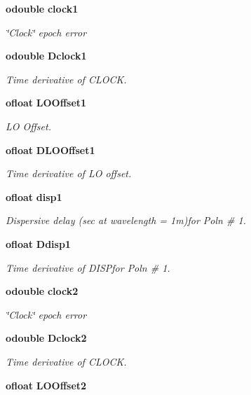 \begin{CompactItemize}
{\bf odouble} {\bf clock1}
\begin{CompactList}\small\item\em \char`\"{}Clock\char`\"{} epoch error \item\end{CompactList}\item 
{\bf odouble} {\bf Dclock1}
\begin{CompactList}\small\item\em Time derivative of CLOCK. \item\end{CompactList}\item 
{\bf ofloat} {\bf LOOffset1}
\begin{CompactList}\small\item\em LO Offset. \item\end{CompactList}\item 
{\bf ofloat} {\bf DLOOffset1}
\begin{CompactList}\small\item\em Time derivative of LO offset. \item\end{CompactList}\item 
{\bf ofloat} {\bf disp1}
\begin{CompactList}\small\item\em Dispersive delay (sec at wavelength = 1m)for Poln \# 1. \item\end{CompactList}\item 
{\bf ofloat} {\bf Ddisp1}
\begin{CompactList}\small\item\em Time derivative of DISPfor Poln \# 1. \item\end{CompactList}\item 
{\bf odouble} {\bf clock2}
\begin{CompactList}\small\item\em \char`\"{}Clock\char`\"{} epoch error \item\end{CompactList}\item 
{\bf odouble} {\bf Dclock2}
\begin{CompactList}\small\item\em Time derivative of CLOCK. \item\end{CompactList}\item 
{\bf ofloat} {\bf LOOffset2}

\end{CompactItemize}
